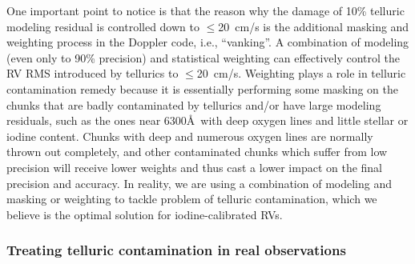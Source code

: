 One important point to notice is that the reason why the damage of
10\% telluric modeling residual is controlled down to $\leq$20~cm/s is
the additional masking and weighting process in the Doppler code,
i.e., ``vanking''. A
combination of modeling (even only to 90\% precision) and statistical
weighting can effectively control the RV RMS introduced by tellurics
to $\leq$20~cm/s. Weighting plays a role in telluric contamination
remedy because it is essentially performing some masking on the
chunks that are badly contaminated by tellurics and/or have large
modeling residuals, such as the ones near 6300\AA\ with deep oxygen
lines and little stellar or iodine content. Chunks with deep and
numerous oxygen lines are normally thrown out completely, and other
contaminated chunks which suffer from low precision will receive lower
weights and thus cast a lower impact on the final precision and
accuracy. In reality, we are using a combination of modeling and
masking or weighting to tackle problem of telluric contamination,
which we believe is the optimal solution for iodine-calibrated RVs.


\subsubsection{Treating telluric contamination in real observations}\label{sec:real}

